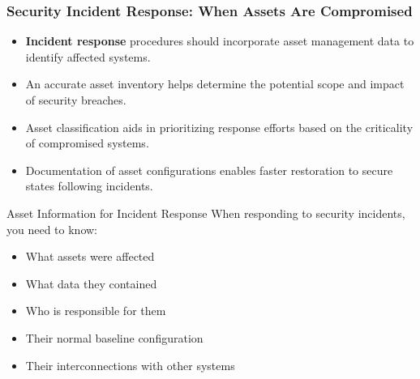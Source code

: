 \documentclass{beamer}
\begin{document}
\begin{frame}
\frametitle{Security Incident Response: When Assets Are Compromised}
\begin{itemize}
    \item \textbf{Incident response} procedures should incorporate asset management data to identify affected systems.
    \item An accurate asset inventory helps determine the potential scope and impact of security breaches.
    \item Asset classification aids in prioritizing response efforts based on the criticality of compromised systems.
    \item Documentation of asset configurations enables faster restoration to secure states following incidents.
\end{itemize}

\begin{alertblock}{Asset Information for Incident Response}
    \scriptsize
    When responding to security incidents, you need to know:
    \begin{itemize}
        \item What assets were affected
        \item What data they contained
        \item Who is responsible for them
        \item Their normal baseline configuration
        \item Their interconnections with other systems
    \end{itemize}
\end{alertblock}
\end{frame}
\end{document}
